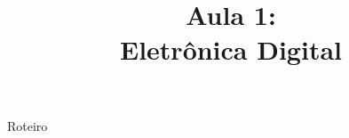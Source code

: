 


\title{Aula 1: \\ Eletrônica Digital}





\begin{frame}

	\maketitle

\end{frame}


\begin{frame}{Roteiro}

	\tableofcontents

\end{frame}







